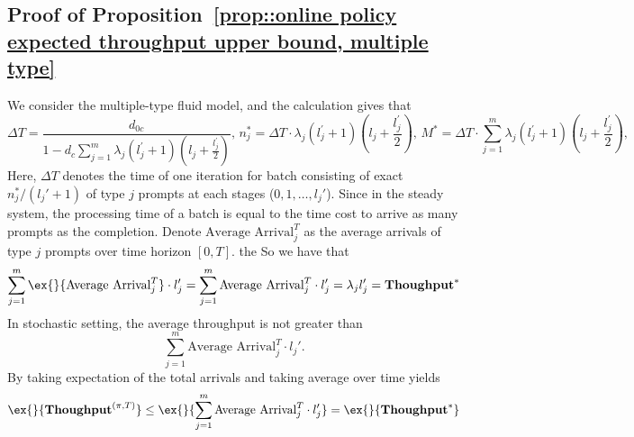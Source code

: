\subsection{Proof of Proposition~\ref{prop::online policy expected throughput upper bound, multiple type}}\label{appendix::proof online policy expected throughput upper bound, multiple type}
We consider the multiple-type fluid model, and the calculation gives that
$$\Delta T = \frac{d_{0c}}{ 1- d_c\sum_{j=1}^m \lambda_j(l_j^\prime+1)\left( l_j + \frac{l_j^\prime}{2} \right) },\,n_j^* = \Delta T\cdot \lambda_j(l_j^\prime+1)\left( l_j + \frac{l_j^\prime}{2} \right) ,\, M^* = \Delta T \cdot \sum_{j=1}^m \lambda_j(l_j^\prime+1)\left( l_j + \frac{l_j^\prime}{2} \right),\,$$
Here, $\Delta T$ denotes the time of one iteration for batch consisting of exact $n_j^*/(l_j'+1)$ of type $j$ prompts at each stages ($0,1,\dots,l_j'$). Since in the steady system, the processing time of a batch is equal to the time cost to arrive as many prompts as the completion. Denote $\text{Average Arrival}_j^T$ as the average arrivals of type $j$ prompts over time horizon $[0,T].$ the So we have that
$$\sum_{j=1}^m\ex{}{ \text{Average Arrival}_j^T }\cdot l_j'=  \sum_{j=1}^m\text{Average Arrival}_j^T \cdot l_j'= \lambda_jl_j' = \throughput^* $$
In stochastic setting, the average throughput is not greater than
\[ 
\sum_{j=1}^m\text{Average Arrival}_j^T \cdot l_j'.
\]
By taking expectation of the total arrivals and taking average over time yields 
$$\ex{}{\throughput^{(\pi,T)}}\leq \ex{}{\sum_{j=1}^m\text{Average Arrival}_j^T\cdot l_j'}=\ex{}{\throughput^*}  $$



